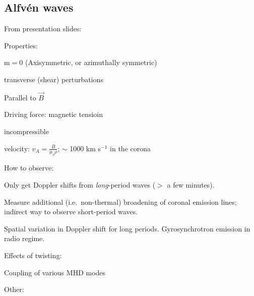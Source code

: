 \documentclass[12pt]{article}
\begin{document}
\subsection*{Alfv\'en waves}
From presentation slides:

Properties:
\begin{itemize*}
    \item m$=$0 (Axisymmetric, or azimuthally symmetric)
    \item transverse (shear) perturbations
    \item Parallel to $\vec{B}$
    \item Driving force: magnetic tensioin
    \item incompressible
    \item velocity: $v_{A} = \frac{B}{\mu_{o}\rho}$;
        $\sim$ 1000 km s$^{-1}$ in the corona
\end{itemize*}
How to observe:
\begin{itemize*}
    \item Only get Doppler shifts from \emph{long}-period waves
        ($>$ a few minutes).
    \item Measure additional (i.e.\ non-thermal) broadening
        of coronal emission lines; indirect way to observe short-period waves.
    \item Spatial variation in Doppler shift for long periods.
        Gyrosynchrotron emission in radio regime.
\end{itemize*}
Effects of twisting:
\begin{itemize*}
    \item Coupling of various MHD modes
\end{itemize*}
Other:
\end{document}
